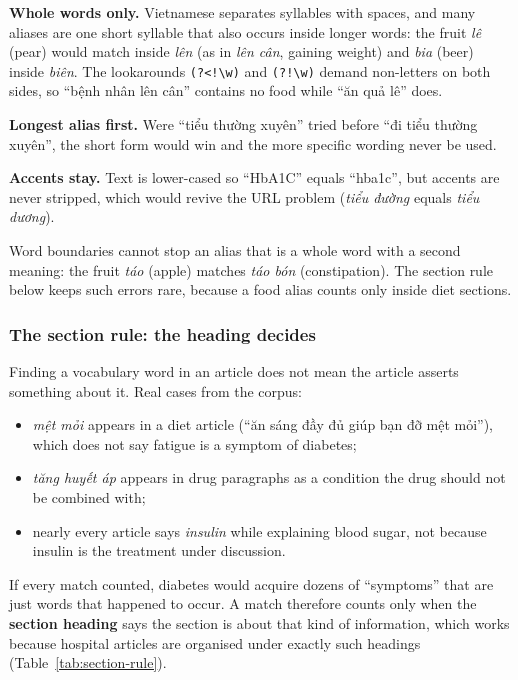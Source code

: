 \documentclass[11pt, a4paper]{article}
\newcommand{\code}[1]{\texttt{#1}}
\begin{document}
\textbf{Whole words only.} Vietnamese separates syllables with spaces, and many aliases are one short syllable that also occurs inside longer words: the fruit \emph{lê} (pear) would match inside \emph{lên} (as in \emph{lên cân}, gaining weight) and \emph{bia} (beer) inside \emph{biên}. The lookarounds \code{(?<!\textbackslash w)} and \code{(?!\textbackslash w)} demand non-letters on both sides, so ``bệnh nhân lên cân'' contains no food while ``ăn quả lê'' does.

\textbf{Longest alias first.} Were ``tiểu thường xuyên'' tried before ``đi tiểu thường xuyên'', the short form would win and the more specific wording never be used.

\textbf{Accents stay.} Text is lower-cased so ``HbA1C'' equals ``hba1c'', but accents are never stripped, which would revive the URL problem (\emph{tiểu đường} equals \emph{tiểu dương}).

Word boundaries cannot stop an alias that is a whole word with a second meaning: the fruit \emph{táo} (apple) matches \emph{táo bón} (constipation). The section rule below keeps such errors rare, because a food alias counts only inside diet sections.

\subsubsection{The section rule: the heading decides}
\label{sec:section-rule}

Finding a vocabulary word in an article does not mean the article asserts something about it. Real cases from the corpus:
\begin{itemize}
    \item \emph{mệt mỏi} appears in a diet article (``ăn sáng đầy đủ giúp bạn đỡ mệt mỏi''), which does not say fatigue is a symptom of diabetes;
    \item \emph{tăng huyết áp} appears in drug paragraphs as a condition the drug should not be combined with;
    \item nearly every article says \emph{insulin} while explaining blood sugar, not because insulin is the treatment under discussion.
\end{itemize}
If every match counted, diabetes would acquire dozens of ``symptoms'' that are just words that happened to occur. A match therefore counts only when the \textbf{section heading} says the section is about that kind of information, which works because hospital articles are organised under exactly such headings (Table~\ref{tab:section-rule}).
\end{document}
